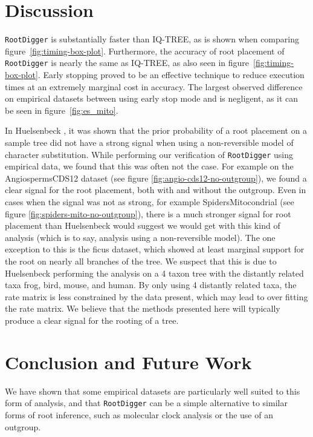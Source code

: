 \documentclass{article}
\newcommand{\RootDiggertt}{\texttt{RootDigger}}
\begin{document}
\section{Discussion}


\RootDiggertt{} is substantially faster than IQ-TREE, as is shown when comparing
figure~\ref{fig:timing-box-plot}. Furthermore, the accuracy of root placement of
\RootDiggertt{} is nearly the same as IQ-TREE, as also seen in
figure~\ref{fig:timing-box-plot}.  Early stopping proved to be an effective
technique to reduce execution times at an extremely marginal cost in accuracy.
The largest observed difference on empirical datasets between using early stop
mode and is negligent, as it can be seen in figure~\ref{fig:es_mito}. 

In Huelsenbeck \cite{huelsenbeck_inferring_2002}, it was shown that the prior
probability of a root placement on a sample tree did not have a strong signal
when using a non-reversible model of character substitution.  While performing
our verification of \RootDiggertt{} using empirical data, we found that this was
often not the case. For example on the AngiospermsCDS12 dataset (see figure
\ref{fig:angio-cds12-no-outgroup}), we found a clear signal for the root
placement, both with and without the outgroup. Even in cases when the signal was
not as strong, for example SpidersMitocondrial (see figure
\ref{fig:spiders-mito-no-outgroup}), there is a much stronger signal for root
placement than Huelsenbeck would suggest we would get with this kind of analysis
(which is to say, analysis using a non-reversible model). The one exception to
this is the ficus dataset, which showed at least marginal support for the root
on nearly all branches of the tree. We suspect that this is due to Huelsenbeck
performing the analysis on a 4 taxon tree with the distantly related taxa frog,
bird, mouse, and human. By only using 4 distantly related taxa, the rate matrix
is less constrained by the data present, which may lead to over fitting the rate
matrix. We believe that the methods presented here will typically produce
a clear signal for the rooting of a tree.

\section{Conclusion and Future Work}

We have shown that some empirical datasets are particularly well suited to this form of
analysis, and that \RootDiggertt{} can be a simple alternative to similar forms
of root inference, such as molecular clock analysis or the use of an outgroup.
\end{document}
